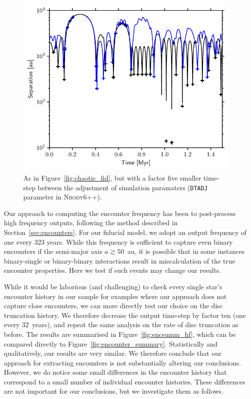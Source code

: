 \documentclass{aa}
\begin{document}
\begin{figure}
    \centering
    \includegraphics[width=\linewidth]{Figures/clustersim_enchist_17_highdtadj.pdf}
    \caption{As in Figure~\ref{fig:chaotic_fid}, but with a factor five smaller time-step between the adjustment of simulation paramaters (\texttt{DTADJ} parameter in \textsc{Nbody6++}). }
    \label{fig:chaotic_hadj}
\end{figure}

Our approach to computing the encounter frequency has been to post-process high frequency outputs, following the method described in Section~\ref{sec:encounters}. For our fiducial model, we adopt an output frequency of one every 323 years. While this frequency is sufficient to capture even binary encounters if the semi-major axis $a \gtrsim 50$~au, it is possible that in some instances binary-single or binary-binary interactions result in miscalculation of the true encounter properties. Here we test if such events may change our results.

While it would be laborious (and challenging) to check every single star's encounter history in our sample for examples where our approach does not capture close encounters, we can more directly test our choice on the disc truncation history. We therefore decrease the output time-step by factor ten (one every $32$~years), and repeat the same analysis on the rate of disc truncation as before. The results are summarised in Figure~\ref{fig:encsumm_hf}, which can be compared directly to Figure~\ref{fig:encounter_summary}. Statistically and qualitatively, our results are very similar. We therefore conclude that our approach for extracting encounters is not substantially altering our conclusions. However, we do notice some small differences in the encounter history that correspond to a small number of individual encounter histories. These differences are not important for our conclusions, but we investigate them as follows. 
\end{document}
